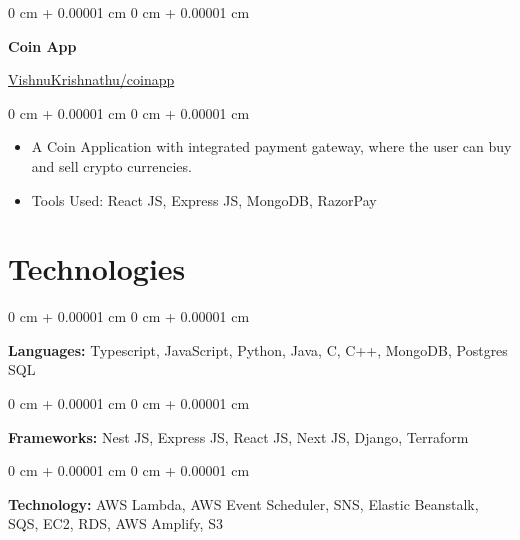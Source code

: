 \documentclass[10pt, letterpaper]{article}
\newenvironment{highlights}{
    \begin{itemize}[
        topsep=0.10 cm,
        parsep=0.10 cm,
        partopsep=0pt,
        itemsep=0pt,
        leftmargin=0 cm + 10pt
    ]
}{
    \end{itemize}
} %
\newenvironment{onecolentry}{
    \begin{adjustwidth}{
        0 cm + 0.00001 cm
    }{
        0 cm + 0.00001 cm
    }
}{
    \end{adjustwidth}
} %
\newenvironment{twocolentry}[2][]{
    \onecolentry
    \def\secondColumn{#2}
    \setcolumnwidth{\fill, 4.5 cm}
    \begin{paracol}{2}
}{
    \switchcolumn \raggedleft \secondColumn
    \end{paracol}
    \endonecolentry
} %
\begin{document}
        \begin{twocolentry}{
            \href{https://vishnukrishnathu.github.io/coinapp/}{VishnuKrishnathu/coinapp}
        }
            \textbf{Coin App}
        \end{twocolentry}

        \vspace{0.10 cm}
        \begin{onecolentry}
            \begin{highlights}
                \item A Coin Application with integrated payment gateway, where the user can buy and sell crypto currencies.
                \item Tools Used: React JS, Express JS, MongoDB, RazorPay
            \end{highlights}
        \end{onecolentry}


        \vspace{0.2 cm}
    
    \section{Technologies}



        
        \begin{onecolentry}
            \textbf{Languages:} Typescript, JavaScript, Python, Java, C, C++, MongoDB, Postgres SQL
        \end{onecolentry}

        \vspace{0.2 cm}

        \begin{onecolentry}
            \textbf{Frameworks:} Nest JS, Express JS, React JS, Next JS, Django, Terraform
        \end{onecolentry}
        \vspace{0.2 cm}
        \begin{onecolentry}
            \textbf{Technology:} AWS Lambda, AWS Event Scheduler, SNS, Elastic Beanstalk, SQS, EC2, RDS, AWS Amplify, S3
        \end{onecolentry}

    
\end{document}
